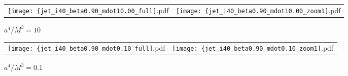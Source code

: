 \documentclass[iop]{emulateapj}
\begin{document}
\begin{figure*}
\begin{center}
  \begin{tabular}{cc}
    \texttt{[image: \{jet\_i40\_beta0.90\_mdot10.00\_full]}.pdf} &
    \texttt{[image: \{jet\_i40\_beta0.90\_mdot10.00\_zoom1]}.pdf} 
  \end{tabular}
\end{center}
\caption{$a^4/M^3=10$}
\label{fig:jet_10.0}
\end{figure*}

\begin{figure*}
\begin{center}
  \begin{tabular}{cc}
    \texttt{[image: \{jet\_i40\_beta0.90\_mdot0.10\_full]}.pdf} &
    \texttt{[image: \{jet\_i40\_beta0.90\_mdot0.10\_zoom1]}.pdf} 
  \end{tabular}
\end{center}
\caption{$a^4/M^3=0.1$}
\label{fig:jet_mdot0.1}
\end{figure*}


\end{document}
